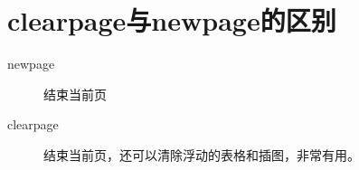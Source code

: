 \section{clearpage与newpage的区别}
\begin{description}
\item[newpage] 结束当前页
\item[clearpage] 结束当前页，还可以清除浮动的表格和插图，非常有用。
\end{description}

